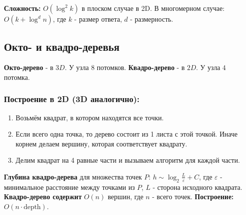 \textbf{Сложность:} $O(\log^2 k)$ в плоском случае в 2D.
В многомерном случае: $O(k + \log^d n)$, где $k$ - размер ответа, $d$ - размерность.

\subsection*{Окто- и квадро-деревья}
\textbf{Окто-дерево} - в $3D$. У узла $8$ потомков.
\textbf{Квадро-дерево} - в $2D$. У узла $4$ потомка.

\subsubsection*{Построение в 2D (3D аналогично):}
\begin{enumerate}
	\item Возьмём квадрат, в котором находятся все точки.
	\item Если всего одна точка, то дерево состоит из 1 листа с этой точкой. Иначе корнем делаем вершину, которая соответствует квадрату.
	\item Делим квадрат на 4 равные части и вызываем алгоритм для каждой части.
\end{enumerate}
\textbf{Глубина квадро-дерева} для множества точек $P$: $h \sim \log_2 \frac{L}{\varepsilon} + C$, где $\varepsilon$ - минимальное расстояние между точками из $P$, $L$ - сторона исходного квадрата.
\textbf{Квадро-дерево содержит} $O(n)$ вершин, где $n$ - всего точек.
\textbf{Построение:} $O(n \cdot \text{depth})$.
